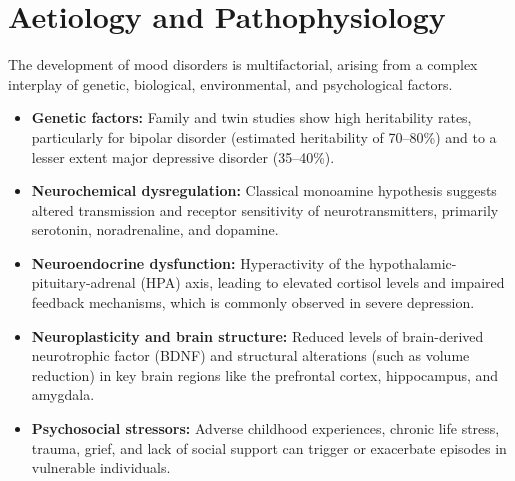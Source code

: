 \section*{Aetiology and Pathophysiology}
The development of mood disorders is multifactorial, arising from a complex interplay of genetic, biological, environmental, and psychological factors.
\begin{itemize}
    \item \textbf{Genetic factors:} Family and twin studies show high heritability rates, particularly for bipolar disorder (estimated heritability of 70--80\%) and to a lesser extent major depressive disorder (35--40\%).
    \item \textbf{Neurochemical dysregulation:} Classical monoamine hypothesis suggests altered transmission and receptor sensitivity of neurotransmitters, primarily serotonin, noradrenaline, and dopamine.
    \item \textbf{Neuroendocrine dysfunction:} Hyperactivity of the hypothalamic-pituitary-adrenal (HPA) axis, leading to elevated cortisol levels and impaired feedback mechanisms, which is commonly observed in severe depression.
    \item \textbf{Neuroplasticity and brain structure:} Reduced levels of brain-derived neurotrophic factor (BDNF) and structural alterations (such as volume reduction) in key brain regions like the prefrontal cortex, hippocampus, and amygdala.
    \item \textbf{Psychosocial stressors:} Adverse childhood experiences, chronic life stress, trauma, grief, and lack of social support can trigger or exacerbate episodes in vulnerable individuals.
\end{itemize}

